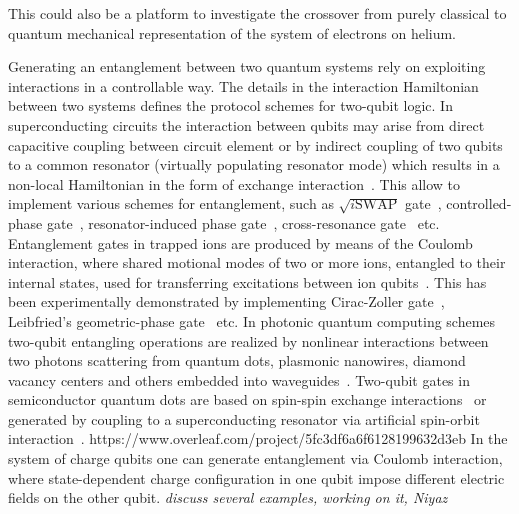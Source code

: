 \documentclass[twocolumn,superscriptaddress,unsortedaddress,
 amsmath,amssymb,
 aps,
]{revtex4-2}
\begin{document}
This could also be a platform to investigate the crossover from purely classical to quantum mechanical representation of the system of electrons on helium. 

Generating an entanglement between two quantum systems rely on exploiting interactions in a controllable way. The details in the interaction Hamiltonian between two systems defines the protocol schemes for two-qubit logic. In superconducting circuits the interaction between qubits may arise from direct capacitive coupling between circuit element or by indirect coupling of two qubits to a common resonator (virtually populating resonator mode) which results in a non-local Hamiltonian in the form of exchange interaction~\cite{blais2020circuit}. This allow to implement various schemes for entanglement, such as $\sqrt{i\text{SWAP}}$ gate~\cite{bialczak2010quantum}, controlled-phase gate~\cite{dicarlo2009demonstration}, resonator-induced phase gate~\cite{paik2016experimental}, cross-resonance gate~\cite{chow2011simple} etc. Entanglement gates in trapped ions are produced by means of the Coulomb interaction, where shared motional modes of two or more ions, entangled to their internal states, used for transferring excitations between ion qubits~\cite{cirac1995quantum}. This has been experimentally demonstrated by implementing Cirac-Zoller gate~\cite{turchette1998deterministic}, Leibfried’s geometric-phase gate~\cite{leibfried2003experimental} etc. In photonic quantum computing schemes two-qubit entangling operations are realized by nonlinear interactions between two photons scattering from quantum dots, plasmonic nanowires, diamond vacancy centers and others embedded into waveguides~\cite{bartlett2020universal}. Two-qubit gates in semiconductor quantum dots are based on spin-spin exchange interactions~\cite{brunner2011two,watson2018programmable} or generated by coupling to a superconducting resonator via artificial spin-orbit interaction~\cite{borjans2020resonant}.
https://www.overleaf.com/project/5fc3df6a6f6128199632d3eb
In the system of charge qubits one can generate entanglement via Coulomb interaction, where state-dependent charge configuration in one qubit impose different electric fields on the other qubit. \textit{discuss several examples, working on it, Niyaz}
\end{document}
